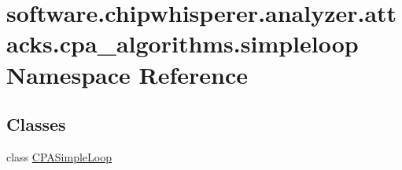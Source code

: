 \hypertarget{namespacesoftware_1_1chipwhisperer_1_1analyzer_1_1attacks_1_1cpa__algorithms_1_1simpleloop}{}\section{software.\+chipwhisperer.\+analyzer.\+attacks.\+cpa\+\_\+algorithms.\+simpleloop Namespace Reference}
\label{namespacesoftware_1_1chipwhisperer_1_1analyzer_1_1attacks_1_1cpa__algorithms_1_1simpleloop}
\subsection*{Classes}
\begin{DoxyCompactItemize}
\item 
class \hyperlink{classsoftware_1_1chipwhisperer_1_1analyzer_1_1attacks_1_1cpa__algorithms_1_1simpleloop_1_1CPASimpleLoop}{C\+P\+A\+Simple\+Loop}
\end{DoxyCompactItemize}
